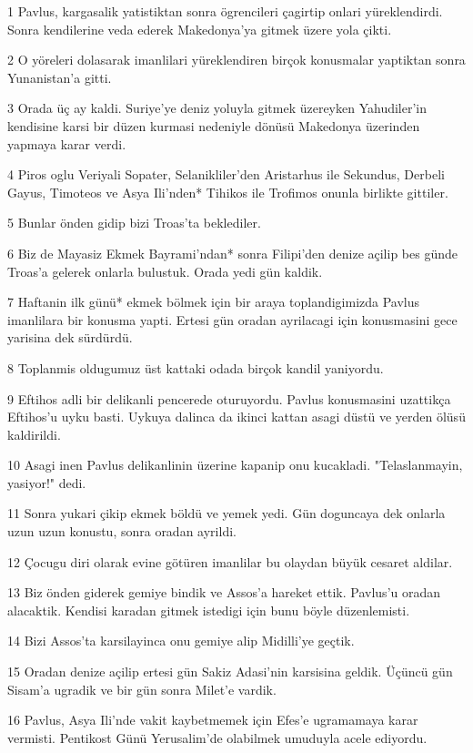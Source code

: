\par 1 Pavlus, kargasalik yatistiktan sonra ögrencileri çagirtip onlari yüreklendirdi. Sonra kendilerine veda ederek Makedonya'ya gitmek üzere yola çikti.
\par 2 O yöreleri dolasarak imanlilari yüreklendiren birçok konusmalar yaptiktan sonra Yunanistan'a gitti.
\par 3 Orada üç ay kaldi. Suriye'ye deniz yoluyla gitmek üzereyken Yahudiler'in kendisine karsi bir düzen kurmasi nedeniyle dönüsü Makedonya üzerinden yapmaya karar verdi.
\par 4 Piros oglu Veriyali Sopater, Selanikliler'den Aristarhus ile Sekundus, Derbeli Gayus, Timoteos ve Asya Ili'nden* Tihikos ile Trofimos onunla birlikte gittiler.
\par 5 Bunlar önden gidip bizi Troas'ta beklediler.
\par 6 Biz de Mayasiz Ekmek Bayrami'ndan* sonra Filipi'den denize açilip bes günde Troas'a gelerek onlarla bulustuk. Orada yedi gün kaldik.
\par 7 Haftanin ilk günü* ekmek bölmek için bir araya toplandigimizda Pavlus imanlilara bir konusma yapti. Ertesi gün oradan ayrilacagi için konusmasini gece yarisina dek sürdürdü.
\par 8 Toplanmis oldugumuz üst kattaki odada birçok kandil yaniyordu.
\par 9 Eftihos adli bir delikanli pencerede oturuyordu. Pavlus konusmasini uzattikça Eftihos'u uyku basti. Uykuya dalinca da ikinci kattan asagi düstü ve yerden ölüsü kaldirildi.
\par 10 Asagi inen Pavlus delikanlinin üzerine kapanip onu kucakladi. "Telaslanmayin, yasiyor!" dedi.
\par 11 Sonra yukari çikip ekmek böldü ve yemek yedi. Gün doguncaya dek onlarla uzun uzun konustu, sonra oradan ayrildi.
\par 12 Çocugu diri olarak evine götüren imanlilar bu olaydan büyük cesaret aldilar.
\par 13 Biz önden giderek gemiye bindik ve Assos'a hareket ettik. Pavlus'u oradan alacaktik. Kendisi karadan gitmek istedigi için bunu böyle düzenlemisti.
\par 14 Bizi Assos'ta karsilayinca onu gemiye alip Midilli'ye geçtik.
\par 15 Oradan denize açilip ertesi gün Sakiz Adasi'nin karsisina geldik. Üçüncü gün Sisam'a ugradik ve bir gün sonra Milet'e vardik.
\par 16 Pavlus, Asya Ili'nde vakit kaybetmemek için Efes'e ugramamaya karar vermisti. Pentikost Günü Yerusalim'de olabilmek umuduyla acele ediyordu.
